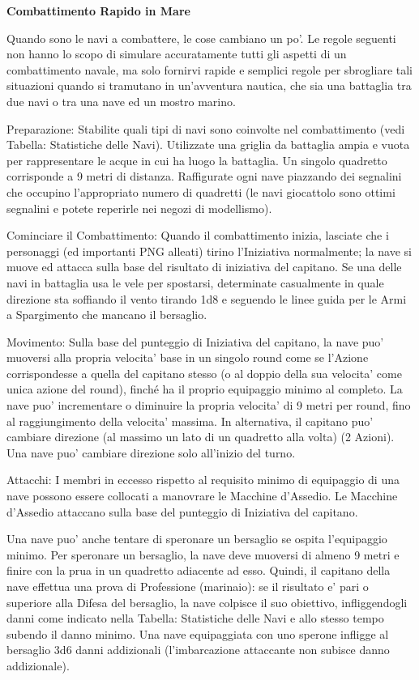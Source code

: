 \documentclass[a4paper,11pt,twoside,openany]{dndbook}
\begin{document}
{\textbf{Combattimento Rapido in Mare}

Quando sono le navi a combattere, le cose cambiano un po'. Le regole seguenti non hanno lo scopo di simulare accuratamente tutti gli aspetti di un combattimento navale, ma solo fornirvi rapide e semplici regole per sbrogliare tali situazioni quando si tramutano in un'avventura nautica, che sia una battaglia tra due navi o tra una nave ed un mostro marino.

{Preparazione:} Stabilite quali tipi di navi sono coinvolte nel combattimento (vedi Tabella: Statistiche delle Navi). Utilizzate una griglia da battaglia ampia e vuota per rappresentare le acque in cui ha luogo la battaglia. Un singolo quadretto corrisponde a 9 metri di distanza. Raffigurate ogni nave piazzando dei segnalini che occupino l'appropriato numero di quadretti (le navi giocattolo sono ottimi segnalini e potete reperirle nei negozi di modellismo).{}

{Cominciare il Combattimento:} Quando il combattimento inizia, lasciate che i personaggi (ed importanti PNG alleati) tirino l'Iniziativa normalmente; la nave si muove ed attacca sulla base del risultato di iniziativa del capitano. Se una delle navi in battaglia usa le vele per spostarsi, determinate casualmente in quale direzione sta soffiando il vento tirando 1d8 e seguendo le linee guida per le Armi a Spargimento che mancano il bersaglio.{}

{Movimento:} Sulla base del punteggio di Iniziativa del capitano, la nave puo' muoversi alla propria velocita' base in un singolo round come se l'Azione corrispondesse a quella del capitano stesso (o al doppio della sua velocita' come unica azione del round), finché ha il proprio equipaggio minimo al completo. La nave puo' incrementare o diminuire la propria velocita' di 9 metri per round, fino al raggiungimento della velocita' massima. In alternativa, il capitano puo' cambiare direzione (al massimo un lato di un quadretto alla volta) (2 Azioni). Una nave puo' cambiare direzione solo all'inizio del turno.{}

{Attacchi:} I membri in eccesso rispetto al requisito minimo di equipaggio di una nave possono essere collocati a manovrare le Macchine d'Assedio. Le Macchine d'Assedio attaccano sulla base del punteggio di Iniziativa del capitano.{}

Una nave puo' anche tentare di speronare un bersaglio se ospita l'equipaggio minimo. Per speronare un bersaglio, la nave deve muoversi di almeno 9 metri e finire con la prua in un quadretto adiacente ad esso. 
Quindi, il capitano della nave effettua una prova di Professione (marinaio): se il risultato e' pari o superiore alla Difesa del bersaglio, la nave colpisce il suo obiettivo, infliggendogli danni come indicato nella Tabella: Statistiche delle Navi e allo stesso tempo subendo il danno minimo. Una nave equipaggiata con uno sperone infligge al bersaglio 3d6 danni addizionali (l'imbarcazione attaccante non subisce danno addizionale).

}
\end{document}
